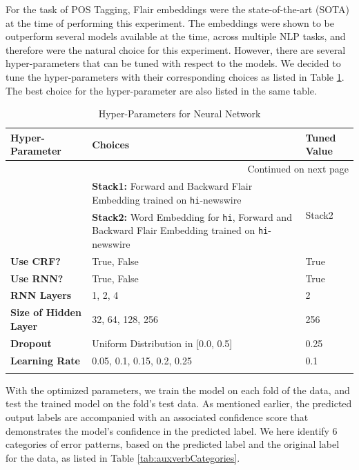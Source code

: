 For the task of POS Tagging, Flair embeddings \citep{flair} were the state-of-the-art (SOTA) at the time of performing this experiment. The embeddings were shown to be outperform several models available at the time, across multiple NLP tasks, and therefore were the natural choice for this experiment. However, there are several hyper-parameters that can be tuned with respect to the models. We decided to tune the hyper-parameters with their corresponding choices as listed in Table \ref{tab:auxverbHyper}. The best choice for the hyper-parameter are also listed in the same table. 

\begin{longtable}{|l|p{6cm}|l|}
    \hline 
    \multicolumn{1}{|l|}{\textbf{Hyper-Parameter}} &
    \multicolumn{1}{p{6cm}|}{\textbf{Choices}} &
    \multicolumn{1}{l|}{\textbf{Tuned Value}} \\
    \hline 
    \endhead
    \hline 
    \multicolumn{3}{|r|}{{Continued on next page}} \\ 
    \hline
    \endfoot
    \endlastfoot
    \hline
    \label{tab:auxverbHyper}
        \multirow{2}{*}{\textbf{Embeddings}} & \textbf{Stack1:} Forward and Backward Flair Embedding trained on \verb|hi|-newswire & \multirow{2}{*}{Stack2}\\
        & \textbf{Stack2:} Word Embedding for \verb|hi|, Forward and Backward Flair Embedding trained on \verb|hi|-newswire & \\
        \hline
        \textbf{Use CRF?} & True, False & True\\
        \hline
        \textbf{Use RNN?} & True, False & True\\
        \hline
        \textbf{RNN Layers} & 1, 2, 4 & 2\\
        \hline
        \textbf{Size of Hidden Layer} & 32, 64, 128, 256 & 256\\
        \hline
        \textbf{Dropout} & Uniform Distribution in [0.0, 0.5] & 0.25\\
        \hline
        \textbf{Learning Rate} & 0.05, 0.1, 0.15, 0.2, 0.25 & 0.1\\
        \hline
    \caption{Hyper-Parameters for Neural Network}
\end{longtable}

With the optimized parameters, we train the model on each fold of the data, and test the trained model on the fold's test data. As mentioned earlier, the predicted output labels are accompanied with an associated confidence score that demonstrates the model's confidence in the predicted label. We here identify 6 categories of error patterns, based on the predicted label and the original label for the data, as listed in Table \ref{tab:auxverbCategories}.

